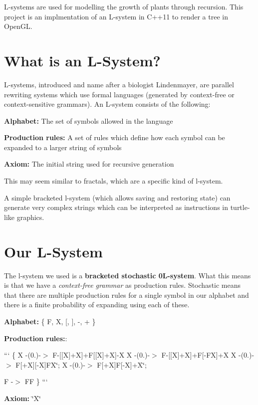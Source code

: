 L-\/systems are used for modelling the growth of plants through recursion. This project is an implmentation of an L-\/system in C++11 to render a tree in Open\+GL.

\section*{What is an L-\/\+System?}

L-\/systems, introduced and name after a biologist Lindenmayer, are parallel rewriting systems which use formal languages (generated by context-\/free or context-\/sensitive grammars). An L-\/system consists of the following\+:
\begin{DoxyEnumerate}
\item {\bfseries Alphabet\+:} The set of symbols allowed in the language
\item {\bfseries Production rules\+:} A set of rules which define how each symbol can be expanded to a larger string of symbols
\item {\bfseries Axiom\+:} The initial string used for recursive generation
\end{DoxyEnumerate}

This may seem similar to fractals, which are a specific kind of l-\/system.

A simple bracketed l-\/system (which allows saving and restoring state) can generate very complex strings which can be interpreted as instructions in turtle-\/like graphics.

\section*{Our L-\/\+System}

The l-\/system we used is a {\bfseries bracketed stochastic 0\+L-\/system}. What this means is that we have a {\itshape context-\/free grammar} as production rules. Stochastic means that there are multiple production rules for a single symbol in our alphabet and there is a finite probability of expanding using each of these.


\begin{DoxyItemize}
\item {\bfseries Alphabet\+:} \{ F, X, \mbox{[}, \mbox{]}, -\/, + \}
\item {\bfseries Production rules\+:}\+:

``` \{ X -\/(0.)-\/$>$ F-\/\mbox{[}\mbox{[}X\mbox{]}+X\mbox{]}+F\mbox{[}\mbox{[}X\mbox{]}+X\mbox{]}-\/X X -\/(0.)-\/$>$ F-\/\mbox{[}\mbox{[}X\mbox{]}+X\mbox{]}+F\mbox{[}-\/\+FX\mbox{]}+X X -\/(0.)-\/$>$ F\mbox{[}+X\mbox{]}\mbox{[}-\/X\mbox{]}FX\char`\"{};
        X -\/(0.)-\/$>$ F\mbox{[}+\+X\mbox{]}\+F\mbox{[}-\/\+X\mbox{]}+\+X\char`\"{};

F -\/$>$ FF \} ```
\item {\bfseries Axiom\+:} \char`\"{}\+X\char`\"{}
\end{DoxyItemize}

